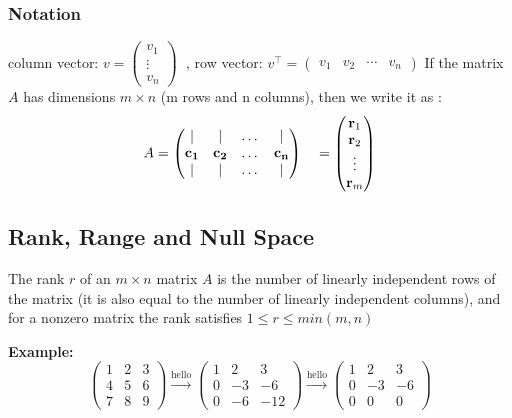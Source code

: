 \documentclass{article}
\begin{document}
\subsubsection{Notation}
	column vector: $ v = \begin{pmatrix} v_1 \\ \vdots \\ v_n \end{pmatrix} \;$ , 
	row vector: $v^\top = \begin{pmatrix} v_1 & v_2 & \cdots & v_n \end{pmatrix} $
		\newline 
		If the matrix $A$ has dimensions $ m \times n $ (m rows and n columns), then we write it as : 
\[
A = \begin{pmatrix}
    \vert & \vert & \dots & \vert \\
    \mathbf{c_1} & \mathbf{c_2} & \dots & \mathbf{c_n} \\
    \vert & \vert & \dots & \vert
\end{pmatrix}
\quad=
\begin{pmatrix}
    \text{\textbf{r}}_1 \\
    \text{\textbf{r}}_2 \\
    \vdots \\
    \text{\textbf{r}}_m
\end{pmatrix}
\]
\subsection{Rank, Range and Null Space}
\begin{tcolorbox}[colback=seashell,colframe=beaublue,title=Rank]	
	The rank $r$ of an $ m \times n $  matrix $A$ is the number of linearly independent rows of
the matrix (it is also equal to the number of linearly independent columns), and
			 for a nonzero matrix the rank satisfies $ 1 \leq r \leq min(m,n) $
\end{tcolorbox}
			
			 \textbf{Example: } 
	 $$
		 \begin{pmatrix} 1 & 2 & 3 \\ 4 & 5 & 6 \\ 7 & 8 & 9 \end{pmatrix}  
				 \xrightarrow{\text{hello}}
\begin{pmatrix} 1 & 2 & 3 \\ 0 & -3 & -6 \\ 0 & -6 & -12 \end{pmatrix}  
				\xrightarrow{\text{hello}}
\begin{pmatrix} 1 & 2 & 3 \\ 0 & -3 & -6 \\ 0 & 0 & 0 \end{pmatrix}  
				 $$
				 
\end{document}
